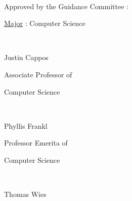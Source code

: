 \thispagestyle{plain}
\mbox{} \\
{\large
Approved by the Guidance Committee :

\vspace{.2 in}

\hspace{.2 in} \underline{Major} : Computer Science

\vspace{.2 in plus 1fill}

\hspace{3.2 in} \hrulefill\

\vspace{-.2 in}

\hspace{3.2 in} Justin Cappos
\vspace{-.1 in}

\hspace{3.2 in} Associate Professor of

\vspace{-.2 in}

\hspace{3.2 in} Computer Science

\vspace{.2 in plus 1fill}




\hspace{3.2 in} \hrulefill\

\vspace{-.2 in}

\hspace{3.2 in} Phyllis Frankl
\vspace{-.1 in}

\hspace{3.2 in} Professor Emerita of

\vspace{-.2 in}

\hspace{3.2 in} Computer Science

\vspace{.2 in plus 1fill}

\hspace{3.2 in} \hrulefill\

\vspace{-.2 in}

\hspace{3.2 in} Thomas Wies
\vspace{-.1 in}

}
